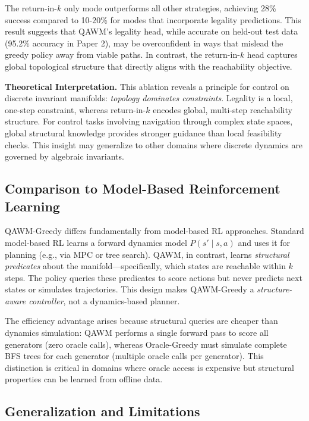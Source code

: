 The return-in-$k$ only mode outperforms all other strategies, achieving 28\% success compared to 10-20\% for modes that incorporate legality predictions. This result suggests that QAWM's legality head, while accurate on held-out test data (95.2\% accuracy in Paper 2), may be overconfident in ways that mislead the greedy policy away from viable paths. In contrast, the return-in-$k$ head captures global topological structure that directly aligns with the reachability objective.

\textbf{Theoretical Interpretation.} This ablation reveals a principle for control on discrete invariant manifolds: \textit{topology dominates constraints}. Legality is a local, one-step constraint, whereas return-in-$k$ encodes global, multi-step reachability structure. For control tasks involving navigation through complex state spaces, global structural knowledge provides stronger guidance than local feasibility checks. This insight may generalize to other domains where discrete dynamics are governed by algebraic invariants.

\subsection{Comparison to Model-Based Reinforcement Learning}

QAWM-Greedy differs fundamentally from model-based RL approaches. Standard model-based RL learns a forward dynamics model $P(s' \mid s, a)$ and uses it for planning (e.g., via MPC or tree search). QAWM, in contrast, learns \textit{structural predicates} about the manifold—specifically, which states are reachable within $k$ steps. The policy queries these predicates to score actions but never predicts next states or simulates trajectories. This design makes QAWM-Greedy a \textit{structure-aware controller}, not a dynamics-based planner.

The efficiency advantage arises because structural queries are cheaper than dynamics simulation: QAWM performs a single forward pass to score all generators (zero oracle calls), whereas Oracle-Greedy must simulate complete BFS trees for each generator (multiple oracle calls per generator). This distinction is critical in domains where oracle access is expensive but structural properties can be learned from offline data.

\subsection{Generalization and Limitations}

